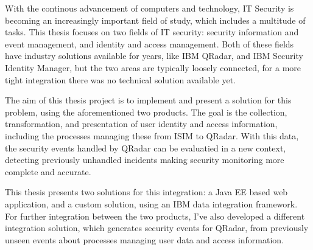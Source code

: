 With the continous advancement of computers and technology, IT Security is becoming an increasingly important field of study, which includes a multitude of tasks. This thesis focuses on two fields of IT security: security information and event management, and identity and access management. Both of these fields have industry solutions available for years, like IBM QRadar, and IBM Security Identity Manager, but the two areas are typically loosely connected, for a more tight integration there was no technical solution available yet.

The aim of this thesis project is to implement and present a solution for this problem, using the aforementioned two products. The goal is the collection, transformation, and presentation of user identity and access information, including the processes managing these from ISIM to QRadar. With this data, the security events handled by QRadar can be evaluatied in a new context, detecting previously unhandled incidents making security monitoring more complete and accurate.

This thesis presents two solutions for this integration: a Java EE based web application, and a custom solution, using an IBM data integration framework. For further integration between the two products, I've also developed a different integration solution, which generates security events for QRadar, from previously unseen events about processes managing user data and access information.


\vfill
\selectthesislanguage

\setcounter{romanPage}{\value{page}}
